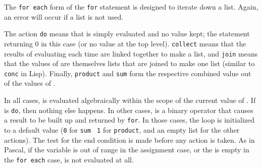 The \texttt{for each} form of the \texttt{for} statement is
designed to iterate down a list.  Again, an error will occur if a list is
not used.

The action \texttt{do} means that  is simply
evaluated and no value kept; the statement returning 0 in this case (or no
value at the top level). \texttt{collect} means that the results of
evaluating  each time are linked together to make a list,
and \texttt{join} means that the values of  are themselves
lists that are joined to make one list (similar to \texttt{conc} in Lisp).
Finally, \texttt{product} and \texttt{sum}
form the respective combined value out of the values of .

In all cases,  is evaluated algebraically within the
scope of the current value of .  If  is
\texttt{do}, then nothing else happens.  In other cases, 
is a binary operator that causes a result to be built up and
returned by \texttt{for}.  In those cases, the loop is
initialized to a default value (\texttt{0} for \texttt{sum} {\tt
1} for \texttt{product}, and an empty list for the other
actions).  The test for the end condition is made before any action is
taken.  As in Pascal, if the variable is out of range in the assignment
case, or the  is empty in the \texttt{for each}
case,  is not evaluated at all.

